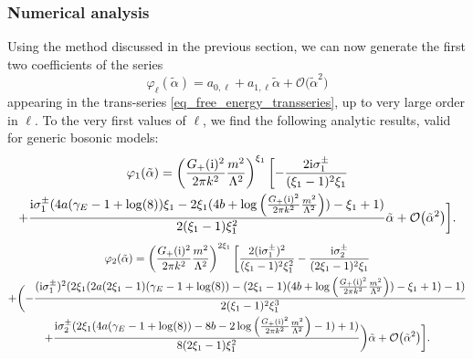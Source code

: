\documentclass[a4paper,11pt]{article}
\theoremstyle{definition}
\newcommand{\ri}{{\rm i}}
\begin{document}
\subsubsection{Numerical analysis}
Using the method discussed in the previous section, we can now generate the first two coefficients of the series
\begin{equation}
\varphi_\ell(\tilde\alpha) = a_{0,\ell} + a_{1,\ell} \tilde\alpha + \mathcal{O}\big(\tilde\alpha^2\big)
\end{equation}
appearing in the trans-series \eqref{eq_free_energy_transseries}, up to very large order in $\ell$. To the very first values of $\ell$, we find the following analytic results, valid for generic bosonic models:
\begin{multline}
\varphi_1(\tilde{\alpha}) = \left( \frac{G_+(\ri)^2}{2\pi k^2} \frac{m^2}{\Lambda^2} \right)^{\xi_1} \biggl[ -\frac{2 \ri \sigma_1^\pm}{(\xi_1-1)^2 \xi_1}\\
+\frac{\ri \sigma_1^\pm (4 a (\gamma_E -1+\log (8))\xi_1 -2\xi_1 ( 4 b +\log\left( \frac{G_+(\ri)^2}{2\pi k^2} \frac{m^2}{\Lambda^2} \right)) -\xi_1 +1)}{2 (\xi_1-1) \xi_1^2} \tilde{\alpha} + \mathcal{O}\big(\tilde{\alpha}^2\big) \biggr].
\label{eq_coeff_bosonic_1}
\end{multline}
\begin{multline}
\varphi_2(\tilde\alpha) = \left( \frac{G_+(\ri)^2}{2\pi k^2} \frac{m^2}{\Lambda^2} \right)^{2\xi_1} \biggl[ \frac{2 (\ri\sigma_1^\pm)^2}{(\xi_1-1)^2 \xi_1^2}-\frac{\ri \sigma_2^\pm}{(2 \xi_1-1)^2 \xi_1}\\
+ \biggl(- \frac{(\ri\sigma_1^\pm)^2 (2 \xi_1 (2 a (2 \xi_1-1) (\gamma_E -1+\log (8)) - (2\xi_1-1)(4 b+\log\left( \frac{G_+(\ri)^2}{2\pi k^2} \frac{m^2}{\Lambda^2} \right) ) - \xi_1 + 1)-1)}{2(\xi_1-1)^2\xi_1^3}\\
+ \frac{\ri \sigma_2^\pm (2 \xi_1 (4 a (\gamma_E -1+\log (8))-8 b-2 \log\left( \frac{G_+(\ri)^2}{2\pi k^2} \frac{m^2}{\Lambda^2} \right)-1)+1)}{8 (2\xi_1-1)\xi_1^2}\biggr) \tilde\alpha   + \mathcal{O}\big(\tilde\alpha ^2\big) \biggl].
\label{eq_coeff_bosonic_2}
\end{multline}
\end{document}
